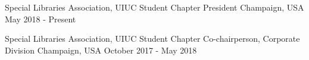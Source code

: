 

\begin{cventries}

  \cventry
    {Special Libraries Association, UIUC Student Chapter} %
    {President} %
    {Champaign, USA} %
    {May 2018 - Present} %
    {
    }

  \cventry
    {Special Libraries Association, UIUC Student Chapter} %
    {Co-chairperson, Corporate Division} %
    {Champaign, USA} %
    {October 2017 - May 2018} %
    {
    } 
    

\end{cventries}
